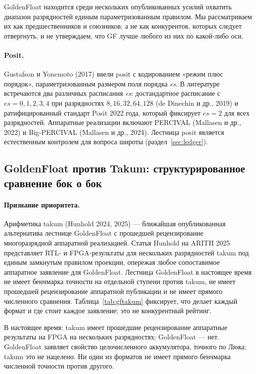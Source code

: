\documentclass[11pt,a4paper]{article}
\theoremstyle{plain}
\begin{document}
GoldenFloat находится среди нескольких опубликованных усилий охватить диапазон
разрядностей единым параметризованным правилом. Мы рассматриваем их как
предшественников и союзников, а не как конкурентов, которых следует отвергнуть,
и не утверждаем, что GF лучше любого из них по какой-либо оси.

\paragraph{Posit.}
Gustafson и Yonemoto (2017) ввели posit с кодированием «режим плюс порядок»,
параметризованным размером поля порядка \emph{es}. В литературе встречаются два
различных расписания \emph{es}: достандартное расписание с
\(es = 0,1,2,3,4\) при разрядностях \(8,16,32,64,128\) (de Dinechin и др., 2019)
и ратифицированный стандарт Posit 2022 года, который фиксирует \(es = 2\) для
всех разрядностей. Аппаратные реализации включают PERCIVAL (Mallasen и др.,
2022) и Big-PERCIVAL (Mallasen и др., 2024). Лестница posit является
естественным контролем для вопроса широты (раздел~\ref{sec:ledger}).

\subsection{GoldenFloat против Takum: структурированное сравнение бок о бок}
\label{sec:gf-takum}

\paragraph{Признание приоритета.}
Арифметика takum (Hunhold 2024, 2025) --- ближайшая опубликованная альтернатива
лестнице GoldenFloat с прошедшей рецензирование многоразрядной аппаратной
реализацией. Статья Hunhold на ARITH 2025 представляет RTL- и FPGA-результаты для
нескольких разрядностей takum под единым замкнутым правилом проекции, опережая
любое сопоставимое аппаратное заявление для GoldenFloat. Лестница GoldenFloat в
настоящее время не имеет бенчмарка точности на отдельной ступени против takum, не
имеет прошедшей рецензирование аппаратной публикации и не имеет прямого
численного сравнения. Таблица~\ref{tab:gftakum} фиксирует, что делает каждый
формат и где стоит каждое заявление; это не конкурентный рейтинг.

В настоящее время: takum имеет прошедшие рецензирование аппаратные результаты на
FPGA на нескольких разрядностях; GoldenFloat --- нет. GoldenFloat заявляет
свойство целочисленного аккумулятора, точного по Люка; takum это не нацелено.
Ни один из форматов не имеет прямого бенчмарка численной точности против другого.
\end{document}
